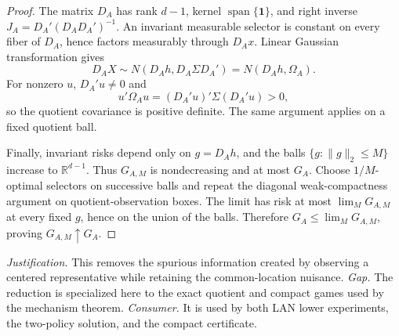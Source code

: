 \documentclass{article}
\begin{document}
\begin{proof}
The matrix \(D_A\) has rank \(d-1\), kernel \(\operatorname{span}\{\mathbf1\}\), and right inverse \(J_A=D_A'(D_AD_A')^{-1}\).  An invariant measurable selector is constant on every fiber of \(D_A\), hence factors measurably through \(D_Ax\).  Linear Gaussian transformation gives
\[
 D_AX\sim N(D_Ah,D_A\Sigma D_A')=N(D_Ah,\Omega_A).
\]
For nonzero \(u\), \(D_A'u\ne0\) and
\[
 u'\Omega_Au=(D_A'u)'\Sigma(D_A'u)>0, \tag{28}
\]
so the quotient covariance is positive definite.  The same argument applies on a fixed quotient ball.

Finally, invariant risks depend only on \(g=D_Ah\), and the balls \(\{g:\|g\|_2\leq M\}\) increase to \(\mathbb R^{d-1}\).  Thus \(G_{A,M}\) is nondecreasing and at most \(G_A\).  Choose \(1/M\)-optimal selectors on successive balls and repeat the diagonal weak-compactness argument on quotient-observation boxes.  The limit has risk at most \(\lim_MG_{A,M}\) at every fixed \(g\), hence on the union of the balls.  Therefore \(G_A\leq\lim_MG_{A,M}\), proving \(G_{A,M}\uparrow G_A\).
\end{proof}
\par\smallskip\noindent \textit{Justification.} This removes the spurious information created by observing a centered representative while retaining the common-location nuisance. \textit{Gap.} The reduction is specialized here to the exact quotient and compact games used by the mechanism theorem. \textit{Consumer.} It is used by both LAN lower experiments, the two-policy solution, and the compact certificate.
\end{document}
